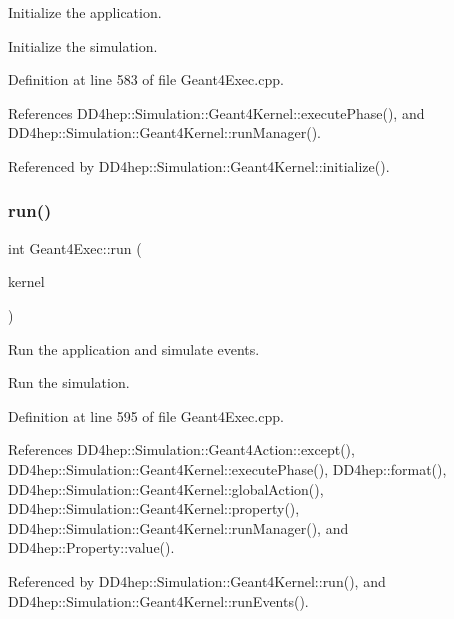 Initialize the application. 

Initialize the simulation. 

Definition at line 583 of file Geant4\+Exec.\+cpp.



References D\+D4hep\+::\+Simulation\+::\+Geant4\+Kernel\+::execute\+Phase(), and D\+D4hep\+::\+Simulation\+::\+Geant4\+Kernel\+::run\+Manager().



Referenced by D\+D4hep\+::\+Simulation\+::\+Geant4\+Kernel\+::initialize().

\hypertarget{class_d_d4hep_1_1_simulation_1_1_geant4_exec_a006a064ae70aa7839d656ae7cdd8fc59}{}\label{class_d_d4hep_1_1_simulation_1_1_geant4_exec_a006a064ae70aa7839d656ae7cdd8fc59} 
\subsubsection{\texorpdfstring{run()}{run()}}
{\footnotesize\ttfamily int Geant4\+Exec\+::run (\begin{DoxyParamCaption}\item[{\hyperlink{class_d_d4hep_1_1_simulation_1_1_geant4_kernel}{Geant4\+Kernel} \&}]{kernel }\end{DoxyParamCaption})\hspace{0.3cm}{\ttfamily [static]}}



Run the application and simulate events. 

Run the simulation. 

Definition at line 595 of file Geant4\+Exec.\+cpp.



References D\+D4hep\+::\+Simulation\+::\+Geant4\+Action\+::except(), D\+D4hep\+::\+Simulation\+::\+Geant4\+Kernel\+::execute\+Phase(), D\+D4hep\+::format(), D\+D4hep\+::\+Simulation\+::\+Geant4\+Kernel\+::global\+Action(), D\+D4hep\+::\+Simulation\+::\+Geant4\+Kernel\+::property(), D\+D4hep\+::\+Simulation\+::\+Geant4\+Kernel\+::run\+Manager(), and D\+D4hep\+::\+Property\+::value().



Referenced by D\+D4hep\+::\+Simulation\+::\+Geant4\+Kernel\+::run(), and D\+D4hep\+::\+Simulation\+::\+Geant4\+Kernel\+::run\+Events().

